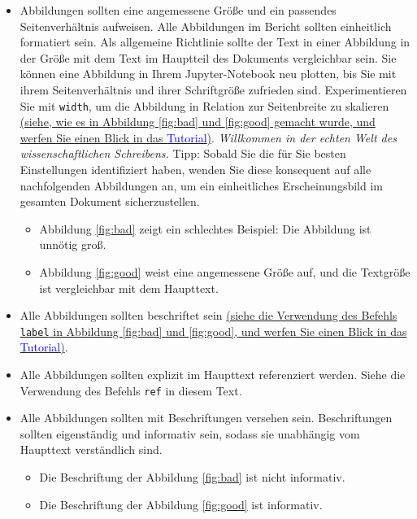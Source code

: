 \documentclass[
	german,
	accentcolor=9c,%
	type=intern,
	marginpar=false
	]{tudapub}
\begin{document}
\begin{itemize}                     
\item Abbildungen sollten eine angemessene Größe und ein passendes Seitenverhältnis aufweisen. Alle Abbildungen im Bericht sollten einheitlich formatiert sein. 
Als allgemeine Richtlinie sollte der Text in einer Abbildung in der Größe mit dem Text im Hauptteil des Dokuments vergleichbar sein. Sie können eine Abbildung in Ihrem Jupyter-Notebook neu plotten, bis Sie mit ihrem Seitenverhältnis und ihrer Schriftgröße zufrieden sind. Experimentieren Sie mit \texttt{width}, um die Abbildung in Relation zur Seitenbreite zu skalieren \href{https://www.overleaf.com/learn/latex/Inserting_Images#Changing_the_image_size_and_rotating_the_picture}{(siehe, wie es in Abbildung \ref{fig:bad} und \ref{fig:good} gemacht wurde, und werfen Sie einen Blick in das \textcolor{blue}{Tutorial})}. \emph{Willkommen in der echten Welt des wissenschaftlichen Schreibens.} Tipp: Sobald Sie die für Sie besten Einstellungen identifiziert haben, wenden Sie diese konsequent auf alle nachfolgenden Abbildungen an, um ein einheitliches Erscheinungsbild im gesamten Dokument sicherzustellen.
    \begin{itemize}          
    \item Abbildung \ref{fig:bad} zeigt ein schlechtes Beispiel: Die Abbildung ist unnötig groß. 
    \item Abbildung \ref{fig:good} weist eine angemessene Größe auf, und die Textgröße ist vergleichbar mit dem Haupttext.
    \end{itemize}  
\item Alle Abbildungen sollten beschriftet sein \href{https://www.overleaf.com/learn/latex/Learn_LaTeX_in_30_minutes#Captions,_labels_and_references}{(siehe die Verwendung des Befehls \texttt{label} in Abbildung \ref{fig:bad} und \ref{fig:good}, und werfen Sie einen Blick in das \textcolor{blue}{Tutorial})}.
\item Alle Abbildungen sollten explizit im Haupttext referenziert werden. Siehe die Verwendung des Befehls \texttt{ref} in diesem Text.
\item Alle Abbildungen sollten mit Beschriftungen versehen sein. Beschriftungen sollten eigenständig und informativ sein, sodass sie unabhängig vom Haupttext verständlich sind.
    \begin{itemize}                    
    \item Die Beschriftung der Abbildung \ref{fig:bad} ist nicht informativ. 
    \item Die Beschriftung der Abbildung \ref{fig:good} ist informativ.
    \end{itemize}  
\end{itemize} 
\end{document}
